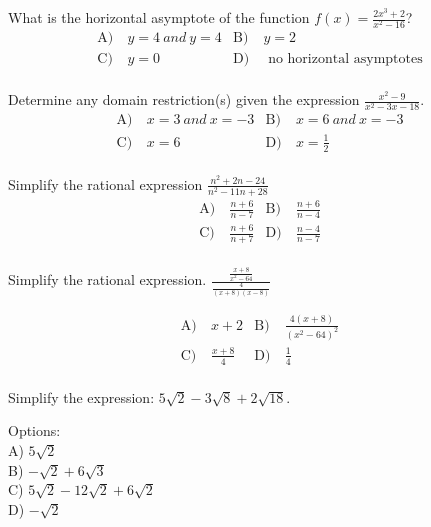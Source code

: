 \begin{problem}\label{Alg2-27}
What is the horizontal asymptote of the function $f(x)=\frac{2 x^{3}+2}{x^{2}-16}$?
\begin{align*}
\text{A)}\ & y=4 \ and \ y=4 &
\text{B)}\ &  y=2\\
\text{C)}\ & y=0 &
\text{D)}\ & \text{ no horizontal asymptotes} \\
\end{align*}    
\end{problem}


\begin{problem}\label{Alg2-28}
Determine any domain restriction(s) given the expression $\frac{x^{2}-9}{x^{2}-3 x-18}$.
\begin{align*}
\text{A)}\ & x=3\ and \ x=-3 &
\text{B)}\ & x=6 \ and \ x=-3 \\
\text{C)}\ & x=6 &
\text{D)}\ & x=\frac{1}{2}\\
\end{align*}    
\end{problem}


\begin{problem}\label{Alg2-29}
Simplify the rational expression $\frac{n^2+2n-24}{n^2-11n+28}$
\begin{align*}
\text{A)}\ & \frac{n+6}{n-7} &
\text{B)}\ &  \frac{n+6}{n-4}\\
\text{C)}\ & \frac{n+6}{n+7} &
\text{D)}\ & \frac{n-4}{n-7}\\
\end{align*}    
\end{problem}


\begin{problem}\label{Alg2-30}
Simplify the rational expression. $\frac{\frac{x+8}{x^2-64}}{\frac{4}{(x+8)(x-8)}}$

\begin{align*}
\text{A)}\ & x+2 &
\text{B)}\ &  \frac{4(x+8)}{(x^2-64)^2}\\
\text{C)}\ & \frac{x+8}{4} &
\text{D)}\ & \frac{1}{4}\\
\end{align*}    
\end{problem}



\begin{problem}\label{AI-Algebra7}
Simplify the expression: \(5\sqrt{2} - 3\sqrt{8} + 2\sqrt{18}\).

\noindent Options:\\
A) \(5\sqrt{2}\)\\
B) \(-\sqrt{2} + 6\sqrt{3}\)\\
C) \(5\sqrt{2} - 12\sqrt{2} + 6\sqrt{2}\)\\
D) \(-\sqrt{2}\)
\end{problem}



